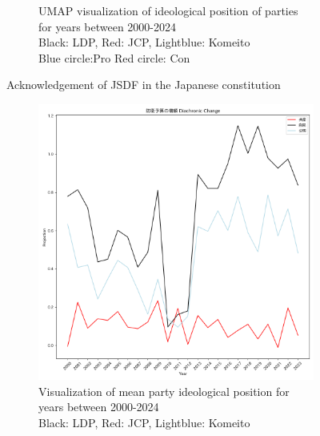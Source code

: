 \documentclass[final,5p,times,twocolumn,authoryear]{elsarticle}
\begin{document}
\begin{figure}[h]
\begin{subfigure}{0.48\textwidth}
		  \caption{UMAP visualization of ideological position of parties for years between 2000-2024 \\\hspace{\textwidth} 
		  Black: LDP, Red: JCP, Lightblue: Komeito\\\hspace{\textwidth}
		  Blue circle:Pro Red circle: Con}
		  \label{fig:sub2}
		\end{subfigure}
	\caption{Acknowledgement of JSDF in the Japanese constitution}
	\label{fig: results-diachronic-defence-constitution}
\end{figure}

\begin{figure}[h]
	\centering
		\begin{subfigure}{0.48\textwidth}
		  \centering
		  \includegraphics[width=\textwidth]{figs/results/diachronic_defence/防衛予算の増額_防衛_diachronic_change.png}
		  \caption{Visualization of mean party ideological position for years between 2000-2024 \\\hspace{\textwidth} Black: LDP, Red: JCP, Lightblue: Komeito}
		  \label{fig:sub1}
		\end{subfigure}
		\hfill
		\begin{subfigure}{0.48\textwidth}
		  \centering

\end{subfigure}
\end{figure}
\end{document}
